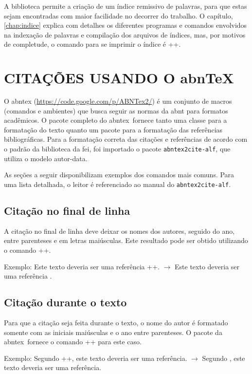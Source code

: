 \documentclass[xindy,rascunho]{fei}
\begin{document}
\begin{teorema}
	A biblioteca permite a criação de um índice remissivo de palavras, para que estas sejam encontradas com maior facilidade no decorrer do trabalho. O capítulo, \ref{chap:indice} explica com detalhes os diferentes programas e comandos envolvidos na indexação de palavras e compilação dos arquivos de índices, mas, por motivos de completude, o comando para se imprimir o índice é \latexinline+\printindex+.

	\chapter{CITAÇÕES USANDO O abn\TeX}\label{chap:referencia}

    O \gls{abntex} (\url{https://code.google.com/p/ABNTex2/}) é um conjunto de macros (comandos e ambientes) que busca seguir as normas da \gls{abnt} para formatos acadêmicos. O pacote completo do \gls{abntex}~fornece tanto uma classe para a formatação do texto quanto um pacote para a formatação das referências bibliográficas. Para a formatação correta das citações e referências de acordo com o padrão da biblioteca da \gls{fei}, foi importado o pacote \texttt{abntex2cite-alf}, que utiliza o modelo autor-data.

    As seções a seguir disponibilizam exemplos dos comandos mais comuns. Para uma lista detalhada, o leitor é referenciado ao manual do \texttt{abntex2cite-alf}.

    \section{Citação no final de linha}
    A citação no final de linha deve deixar os nomes dos autores, seguido do ano, entre parenteses e em letras maiúsculas. Este resultado pode ser obtido utilizando o comando \latexinline+\cite{obra}+.

    Exemplo: Este texto deveria ser uma referência \latexinline+\cite{j:turing50}+. $\to$ Este texto deveria ser uma referência \cite{j:turing50}.

    \section{Citação durante o texto}
    Para que a citação seja feita durante o texto, o nome do autor é formatado somente com as iniciais maiúsculas e o ano entre parenteses. O pacote da \gls{abntex}~fornece o comando \latexinline++ para este caso.

    Exemplo: Segundo \latexinline++, este texto deveria ser uma referência. $\to$ Segundo , este texto deveria ser uma referência.
	

\end{teorema}
\end{document}
